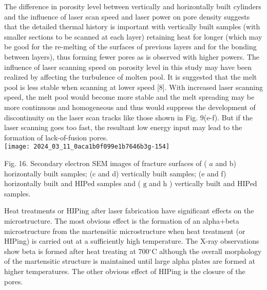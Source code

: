 \documentclass[10pt]{article}
\begin{document}
The difference in porosity level between vertically and horizontally built cylinders and the influence of laser scan speed and laser power on pore density suggests that the detailed thermal history is important with vertically built samples (with smaller sections to be scanned at each layer) retaining heat for longer (which may be good for the re-melting of the surfaces of previous layers and for the bonding between layers), thus forming fewer pores as is observed with higher powers. The influence of laser scanning speed on porosity level in this study may have been realized by affecting the turbulence of molten pool. It is suggested that the melt pool is less stable when scanning at lower speed [8]. With increased laser scanning speed, the melt pool would become more stable and the melt spreading may be more continuous and homogeneous and thus would suppress the development of discontinuity on the laser scan tracks like those shown in Fig. 9(e-f). But if the laser scanning goes too fast, the resultant low energy input may lead to the formation of lack-of-fusion pores.\\
\texttt{[image: 2024\_03\_11\_0aca1b0f099e1b7646b3g-154]}

Fig. 16. Secondary electron SEM images of fracture surfaces of ( $a$ and b) horizontally built samples; (c and d) vertically built samples; (e and f) horizontally built and HIPed samples and ( $\mathrm{g}$ and $\mathrm{h}$ ) vertically built and HIPed samples.

Heat treatments or HIPing after laser fabrication have significant effects on the microstructure. The most obvious effect is the formation of an alpha+beta microstructure from the martensitic microstructure when heat treatment (or HIPing) is carried out at a sufficiently high temperature. The X-ray observations show beta is formed after heat treating at $700{ }^{\circ} \mathrm{C}$ although the overall morphology of the martensitic structure is maintained until large alpha plates are formed at higher temperatures. The other obvious effect of HIPing is the closure of the pores.
\end{document}
